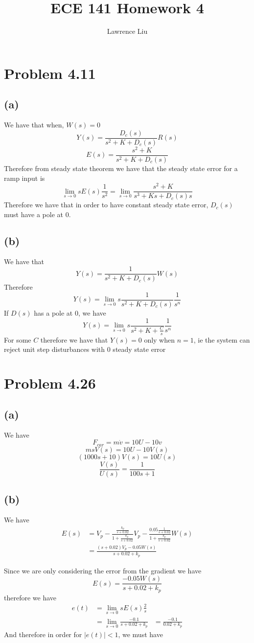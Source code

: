 \documentclass[12pt]{article}
\title{ECE 141 Homework 4}
\author{Lawrence Liu}
\begin{document}
\maketitle
\section*{Problem 4.11}
\subsection*{(a)}
We have that when, $W(s)=0$
$$Y(s)=\frac{D_c(s)}{s^2+K+D_c(s)}R(s)$$
$$E(s)=\frac{s^2+K}{s^2+K+D_c(s)}$$
Therefore from steady state theorem we have that the steady state error for a ramp input is
$$\lim_{s\to 0}sE(s)\frac{1}{s^2}=
\lim_{s\to 0}\frac{s^2+K}{s^3+Ks+D_c(s)s}$$
Therefore we have that in order to have constant steady state error, $D_c(s)$ must have
a pole at $0$.
\subsection*{(b)}
We have that
$$Y(s)=\frac{1}{s^2+K+D_c(s)}W(s)$$
Therefore
$$Y(s)=\lim_{s\to 0}s\frac{1}{s^2+K+D_c(s)}\frac{1}{s^n}$$
If $D(s)$ has a pole at 0, we have
$$Y(s)=\lim_{s\to 0}s\frac{1}{s^2+K+\frac{C}{s}}\frac{1}{s^n}$$
For some $C$
therefore we have that $Y(s)=0$ only when $n=1$, ie the system can reject
unit step disturbances with 0 steady state error 
\section*{Problem 4.26}
\subsection*{(a)}
We have 
$$F_{car}=m\dot{v}=10U-10v$$
$$msV(s)=10U-10V(s)$$
$$(1000s+10)V(s)=10U(s)$$
$$\frac{V(s)}{U(s)}=\frac{1}{100s+1}$$
\subsection*{(b)}
We have
\begin{align*}
    E(s)&=V_p-\frac{\frac{k_p}{s+0.02}}{1+\frac{k_p}{s+0.02}}V_p-
\frac{0.05\frac{1}{s+0.02}}{1+\frac{k_p}{s+0.02}}W(s)\\
&=\frac{(s+0.02)V_p-0.05W(s)}{s+0.02+k_p}
\end{align*}

Since we are only considering the error from the gradient we have
$$E(s)=\frac{-0.05W(s)}{s+0.02+k_p}$$
therefore we have
\begin{align*}
    e(t)&=\lim_{s\to0}sE(s)\frac{2}{s}\\
    &=\lim_{s\to0}\frac{-0.1}{s+0.02+k_p}
    &=\frac{-0.1}{0.02+k_p}
\end{align*}
And therefore in order for  $|e(t)|<1$, we must have
\end{document}
